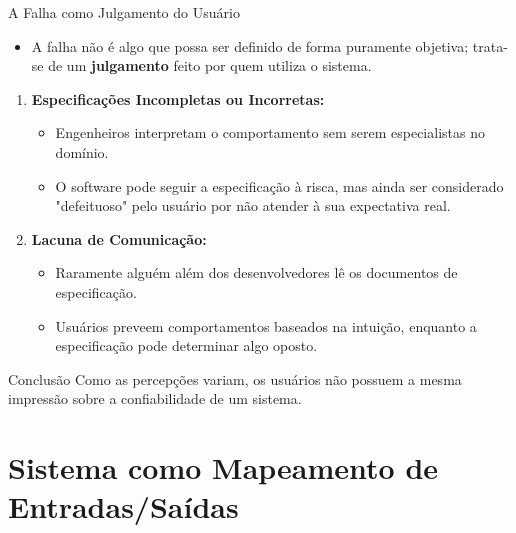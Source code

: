 \documentclass[9pt]{beamer}
\begin{document}
\begin{frame}{A Falha como Julgamento do Usuário}
    \begin{itemize}
        \item A falha não é algo que possa ser definido de forma puramente objetiva; trata-se de um \textbf{julgamento} feito por quem utiliza o sistema.
    \end{itemize}

    \begin{enumerate}
        \item \textbf{Especificações Incompletas ou Incorretas:}
        \begin{itemize}
            \item Engenheiros interpretam o comportamento sem serem especialistas no domínio.
            \item O software pode seguir a especificação à risca, mas ainda ser considerado "defeituoso" pelo usuário por não atender à sua expectativa real.
        \end{itemize}
        
        \item \textbf{Lacuna de Comunicação:}
        \begin{itemize}
            \item Raramente alguém além dos desenvolvedores lê os documentos de especificação.
            \item Usuários preveem comportamentos baseados na intuição, enquanto a especificação pode determinar algo oposto.
        \end{itemize}
    \end{enumerate}

    \begin{block}{Conclusão}
        Como as percepções variam, os usuários não possuem a mesma impressão sobre a confiabilidade de um sistema.
    \end{block}
\end{frame}

\section{Sistema como Mapeamento de Entradas/Saídas}  
\end{document}
